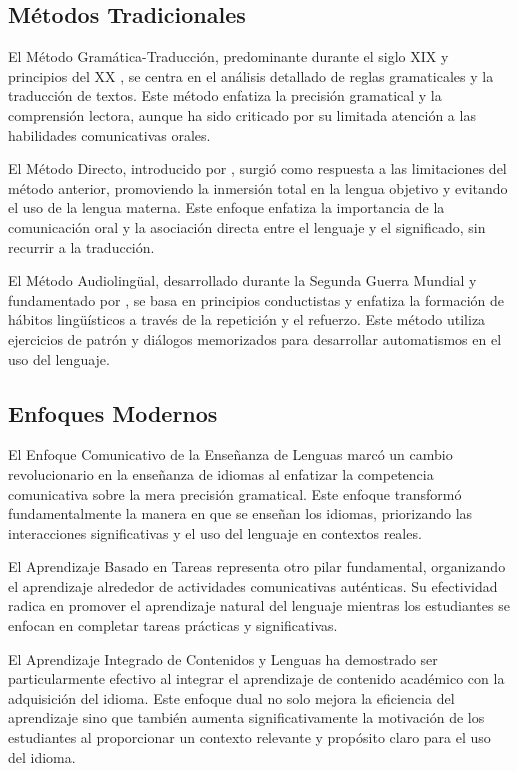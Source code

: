\subsection{Métodos Tradicionales}

El Método Gramática-Traducción, predominante durante el siglo XIX y principios del XX \cite{richards2000approaches}, se centra en el análisis detallado de reglas gramaticales y la traducción de textos. Este método enfatiza la precisión gramatical y la comprensión lectora, aunque ha sido criticado por su limitada atención a las habilidades comunicativas orales.

El Método Directo, introducido por \cite{gouin1892art}, surgió como respuesta a las limitaciones del método anterior, promoviendo la inmersión total en la lengua objetivo y evitando el uso de la lengua materna. Este enfoque enfatiza la importancia de la comunicación oral y la asociación directa entre el lenguaje y el significado, sin recurrir a la traducción.

El Método Audiolingüal, desarrollado durante la Segunda Guerra Mundial y fundamentado por \cite{fries1945teaching}, se basa en principios conductistas y enfatiza la formación de hábitos lingüísticos a través de la repetición y el refuerzo. Este método utiliza ejercicios de patrón y diálogos memorizados para desarrollar automatismos en el uso del lenguaje.

\subsection{Enfoques Modernos}

El Enfoque Comunicativo de la Enseñanza de Lenguas \cite{hymes1972communicative} marcó un cambio revolucionario en la enseñanza de idiomas al enfatizar la competencia comunicativa sobre la mera precisión gramatical. Este enfoque transformó fundamentalmente la manera en que se enseñan los idiomas, priorizando las interacciones significativas y el uso del lenguaje en contextos reales.

El Aprendizaje Basado en Tareas \cite{nunan1989designing} representa otro pilar fundamental, organizando el aprendizaje alrededor de actividades comunicativas auténticas. Su efectividad radica en promover el aprendizaje natural del lenguaje mientras los estudiantes se enfocan en completar tareas prácticas y significativas.

El Aprendizaje Integrado de Contenidos y Lenguas \cite{coyle2010clil} ha demostrado ser particularmente efectivo al integrar el aprendizaje de contenido académico con la adquisición del idioma. Este enfoque dual no solo mejora la eficiencia del aprendizaje sino que también aumenta significativamente la motivación de los estudiantes al proporcionar un contexto relevante y propósito claro para el uso del idioma.

